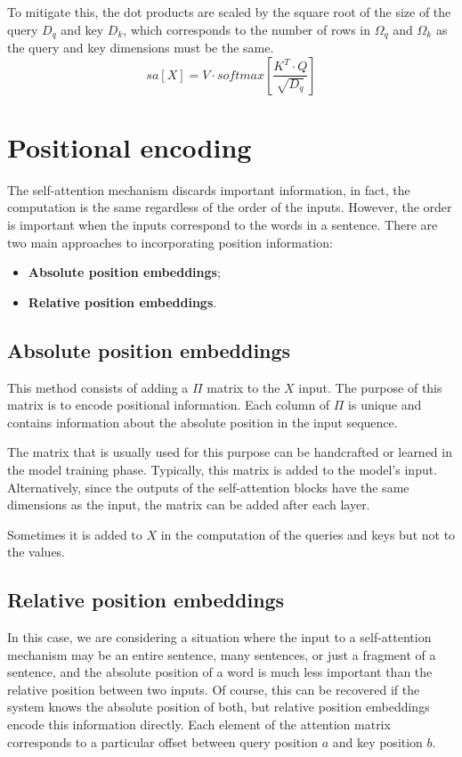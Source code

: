 To mitigate this, the dot products are scaled by the square root of the size of
the query $D_q$ and key $D_k$, which corresponds to the number of rows in $\Omega_q$
and $\Omega_k$ as the query and key dimensions must be the same.
\begin{equation}
    sa[X] = V \cdot softmax\left[\frac{K^T \cdot Q}{\sqrt{D_q}}\right]
\end{equation}

\section{Positional encoding}
The self-attention mechanism discards important information, in fact, the computation
is the same regardless of the order of the inputs. However, the order is important
when the inputs correspond to the words in a sentence. There are two main approaches
to incorporating position information:
\begin{itemize}
    \item \textbf{Absolute position embeddings};
    \item \textbf{Relative position embeddings}.
\end{itemize}
\subsection{Absolute position embeddings}
This method consists of adding a $\Pi$ matrix to the $X$ input. The purpose of
this matrix is to encode positional information. Each column of $\Pi$ is unique
and contains information about the absolute position in the input sequence.

The matrix that is usually used for this purpose can be handcrafted or learned in
the model training phase. Typically, this matrix is added to the model's input.
Alternatively, since the outputs of the self-attention blocks have the same dimensions
as the input, the matrix can be added after each layer.

\begin{note}
    Sometimes it is added to $X$ in the computation of the queries and keys but
    not to the values.
\end{note}

\subsection{Relative position embeddings}
In this case, we are considering a situation where the input to a self-attention
mechanism may be an entire sentence, many sentences, or just a fragment of a sentence,
and the absolute position of a word is much less important than the relative
position between two inputs. Of course, this can be recovered if the system knows
the absolute position of both, but relative position embeddings encode this
information directly. Each element of the attention matrix corresponds to a
particular offset between query position $a$ and key position $b$.


